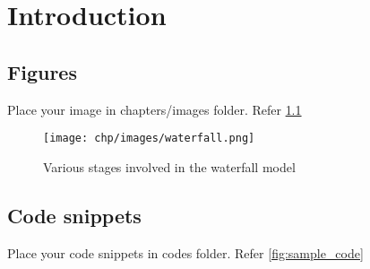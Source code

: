 \chapter{Introduction}

\section{Figures}

Place your image in chapters/images folder. Refer \ref{fig:waterfall}
\begin{figure}
	\centering
	\texttt{[image: chp/images/waterfall.png]}
	\caption{Various stages involved in the waterfall model}
	\label{fig:waterfall}
\end{figure}

\section{Code snippets}
Place your code snippets in codes folder. Refer \ref{fig:sample_code} 
